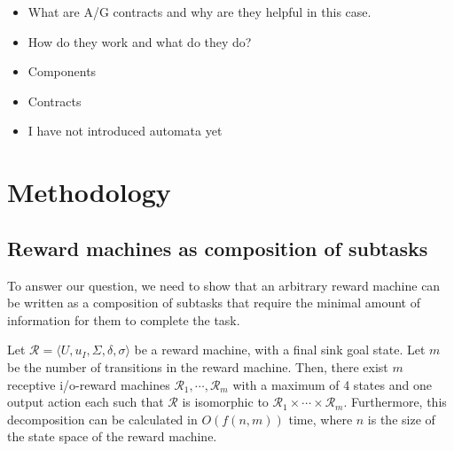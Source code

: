 \documentclass[11pt]{article}
\begin{document}
\begin{itemize}
    \item What are A/G contracts and why are they helpful in this case.
    \item How do they work and what do they do?
    \item Components
    \item Contracts
    \item I have not introduced automata yet
\end{itemize}

\section{Methodology}
\subsection{Reward machines as composition of subtasks}
To answer our question, we need to show that an arbitrary reward machine can be written as a composition of subtasks that require the minimal amount of information for them to complete the task.

\begin{theorem}
    Let $\mathcal{R} = \langle U, u_I, \Sigma, \delta, \sigma \rangle$ be a reward machine, with a final sink goal state.
    Let $m$ be the number of transitions in the reward machine.
    Then, there exist $m$ receptive i/o-reward machines $\mathcal{R}_1, \cdots, \mathcal{R}_m$ with a maximum of 4 states and one output action each such that $\mathcal{R}$ is isomorphic to $\mathcal{R}_1 \times \cdots \times \mathcal{R}_m$.
    Furthermore, this decomposition can be calculated in $O(f(n,m))$ time, where $n$ is the size of the state space of the reward machine.
\end{theorem}
\end{document}
